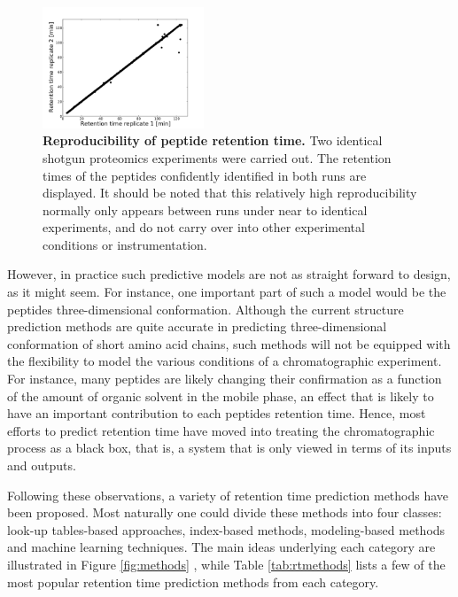 \documentclass[a4paper]{article}
\begin{document}
\begin{figure}[p]
\centering
\includegraphics[trim=0.5cm 0cm 2cm 1.5cm, clip=true, width=0.43\textwidth]{img/reproducibility.pdf}
\caption{\label{fig:repr} {\bf Reproducibility of peptide retention
    time.} Two identical shotgun proteomics experiments were carried
  out. The retention times of the peptides confidently identified in
  both runs are displayed. It should be noted that this relatively high reproducibility normally only appears between runs under near to identical experiments, and do not carry over into other experimental conditions or instrumentation.}
\end{figure}

However, in practice such predictive models are not as straight
forward to design, as it might seem. For instance, one important part
of such a model would be the peptides three-dimensional
conformation. Although the current structure prediction methods are
quite accurate in predicting three-dimensional conformation of short
amino acid chains, such methods will not be equipped with the
flexibility to model the various conditions of a chromatographic
experiment. For instance, many peptides are likely changing their
confirmation as a function of the amount of organic solvent in the
mobile phase, an effect that is likely to have an important
contribution to each peptides retention time. Hence, most efforts to
predict retention time have moved into treating the chromatographic
process as a black box, that is, a system that is only viewed in terms
of its inputs and outputs.
 
  
Following these observations, a variety of retention time prediction
methods have been proposed. Most naturally one could divide these
methods into four classes: look-up tables-based approaches,
index-based methods, modeling-based methods and machine learning
techniques. The main ideas underlying each category are illustrated in
Figure \ref{fig:methods} , while Table \ref{tab:rtmethods} lists a few
of the most popular retention time prediction methods from each
category.
\end{document}
